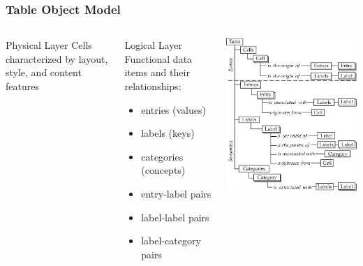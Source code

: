 \documentclass[10pt]{beamer}
\begin{document}
\begin{frame}
\frametitle{Table Object Model}
\begin{columns}[c] %
\begin{block}{\small Physical Layer}
\small Cells characterized by layout, style, and content features
\end{block}
\begin{block}{\small Logical Layer}
\small Functional data items and their relationships:
\begin{itemize}
	\item \small entries (values)
	\item \small labels (keys)
	\item \small categories (concepts)
	\item \small entry-label pairs
	\item \small label-label pairs
	\item \small label-category pairs
\end{itemize}
\end{block}
\includegraphics[width=0.85\linewidth]{tom}
\end{columns}
\end{frame}
\end{document}
